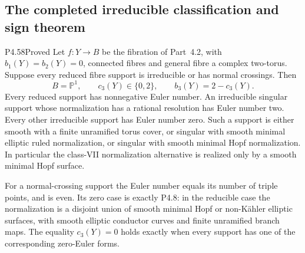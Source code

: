 \subsection{The completed irreducible classification and sign theorem}

\begin{statement}{P4.58}{Proved}
Let $f:Y\to B$ be the fibration of Part~4.2, with
$b_1(Y)=b_2(Y)=0$, connected fibres and general fibre a
complex two-torus. Suppose every reduced fibre support
is irreducible or has normal crossings. Then
\[
 B=\mathbb P^1,\qquad c_3(Y)\in\{0,2\},
                       \qquad b_3(Y)=2-c_3(Y).
\]
Every reduced support has nonnegative Euler number.
An irreducible singular support whose normalization has
a rational resolution has Euler number two. Every other
irreducible support has Euler number zero. Such a support
is either smooth with a finite unramified torus cover,
or singular with smooth minimal elliptic ruled
normalization, or singular with smooth minimal Hopf
normalization. In particular the class-VII normalization
alternative is realized only by a smooth minimal Hopf
surface.

For a normal-crossing support the Euler number equals
its number of triple points, and is even. Its zero case
is exactly P4.8: in the reducible case the normalization
is a disjoint union of smooth minimal Hopf or non-K\"ahler
elliptic surfaces, with smooth elliptic conductor curves
and finite unramified branch maps. The equality
$c_3(Y)=0$ holds exactly when every support has one of
the corresponding zero-Euler forms.
\end{statement}
